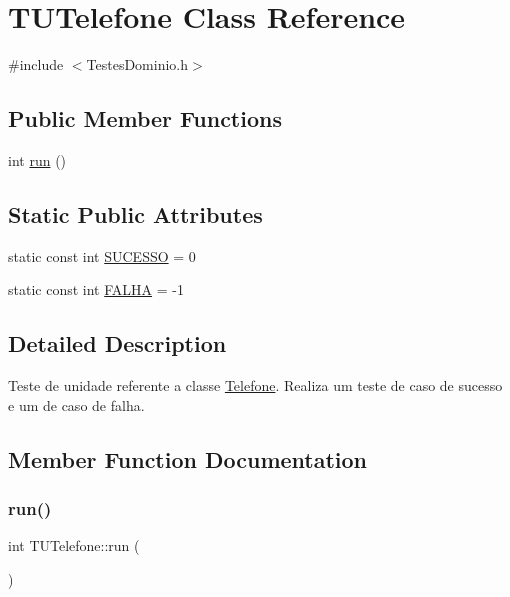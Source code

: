 \hypertarget{class_t_u_telefone}{}\section{T\+U\+Telefone Class Reference}
\label{class_t_u_telefone}


{\ttfamily \#include $<$Testes\+Dominio.\+h$>$}

\subsection*{Public Member Functions}
\begin{DoxyCompactItemize}
\item 
int \hyperlink{class_t_u_telefone_abdf98e48a737ab44ad59cc63f26d6788}{run} ()
\end{DoxyCompactItemize}
\subsection*{Static Public Attributes}
\begin{DoxyCompactItemize}
\item 
static const int \hyperlink{class_t_u_telefone_a26c0d033f5372652434fdcb5b054c16e}{S\+U\+C\+E\+S\+SO} = 0
\item 
static const int \hyperlink{class_t_u_telefone_a6bfda7ef5af9266bd5ca1b246002f3c7}{F\+A\+L\+HA} = -\/1
\end{DoxyCompactItemize}


\subsection{Detailed Description}
Teste de unidade referente a classe \hyperlink{class_telefone}{Telefone}. Realiza um teste de caso de sucesso e um de caso de falha. 

\subsection{Member Function Documentation}
\mbox{\label{class_t_u_telefone_abdf98e48a737ab44ad59cc63f26d6788}} 
\subsubsection{\texorpdfstring{run()}{run()}}
{\footnotesize\ttfamily int T\+U\+Telefone\+::run (\begin{DoxyParamCaption}{ }\end{DoxyParamCaption})}




